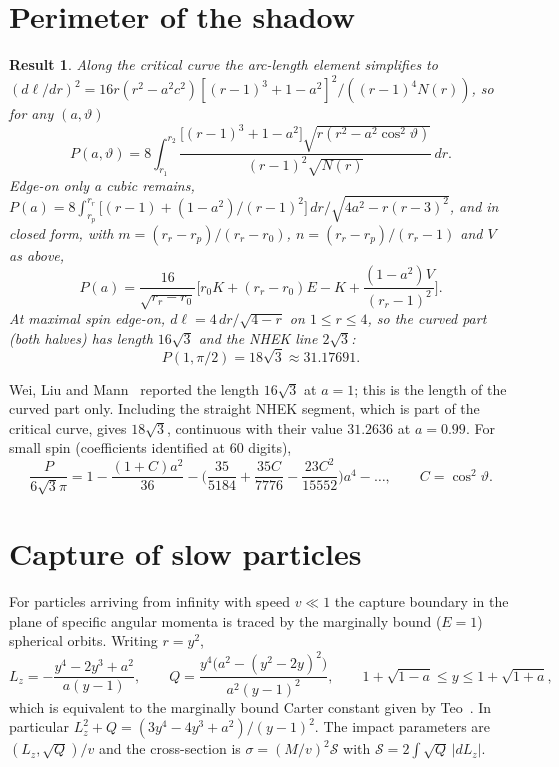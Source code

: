 \documentclass[11pt,a4paper]{article}
\newtheorem{result}{Result}
\theoremstyle{remark}
\numberwithin{equation}{section}
\begin{document}
\section{Perimeter of the shadow}\label{sec:perim}
\begin{result}\label{res:perim}
Along the critical curve the arc-length element simplifies to
$(d\ell/dr)^2=16r(r^2-a^2c^2)[(r-1)^3+1-a^2]^2/((r-1)^4N(r))$, so for any $(a,\vartheta)$
\begin{equation}
P(a,\vartheta)=8\int_{r_1}^{r_2}\frac{\big[(r-1)^3+1-a^2\big]\sqrt{r(r^2-a^2\cos^2\vartheta)}}{(r-1)^2\sqrt{N(r)}}\,dr .
\end{equation}
Edge-on only a cubic remains,
$P(a)=8\int_{r_p}^{r_r}\big[(r-1)+(1-a^2)/(r-1)^2\big]\,dr/\sqrt{4a^2-r(r-3)^2}$, and in closed form, with
$m=(r_r-r_p)/(r_r-r_0)$, $n=(r_r-r_p)/(r_r-1)$ and $V$ as above,
\begin{equation}
P(a)=\frac{16}{\sqrt{r_r-r_0}}\Big[r_0K+(r_r-r_0)E-K+\frac{(1-a^2)V}{(r_r-1)^2}\Big].
\end{equation}
At maximal spin edge-on, $d\ell=4\,dr/\sqrt{4-r}$ on $1\le r\le4$, so the curved part (both halves) has length $16\sqrt3$ and the
NHEK line $2\sqrt3$:
\begin{equation}
P(1,\pi/2)=18\sqrt3\approx31.17691 .
\end{equation}
\end{result}
Wei, Liu and Mann~\cite{WeiLiuMann2019} reported the length $16\sqrt3$ at $a=1$; this is the length of the curved
part only. Including the straight NHEK segment, which is part of the critical curve, gives $18\sqrt3$, continuous
with their value $31.2636$ at $a=0.99$. For small spin (coefficients identified at 60 digits),
\begin{equation}
\frac{P}{6\sqrt3\pi}=1-\frac{(1+C)a^2}{36}-\Big(\frac{35}{5184}+\frac{35C}{7776}-\frac{23C^2}{15552}\Big)a^4-\dots,\qquad C=\cos^2\vartheta .
\end{equation}

\section{Capture of slow particles}\label{sec:capture}
For particles arriving from infinity with speed $v\ll1$ the capture boundary in the plane of specific
angular momenta is traced by the marginally bound ($E=1$) spherical orbits. Writing $r=y^2$,
\begin{equation}
L_z=-\frac{y^4-2y^3+a^2}{a(y-1)},\qquad Q=\frac{y^4\big(a^2-(y^2-2y)^2\big)}{a^2(y-1)^2},\qquad 1+\sqrt{1-a}\le y\le1+\sqrt{1+a},
\label{eq:mb}
\end{equation}
which is equivalent to the marginally bound Carter constant given by Teo~\cite{Teo2021}. In particular
$L_z^2+Q=(3y^4-4y^3+a^2)/(y-1)^2$. The impact parameters are $(L_z,\sqrt Q)/v$ and the cross-section is
$\sigma=(M/v)^2\mathcal S$ with $\mathcal S=2\int\sqrt Q\,|dL_z|$.
\end{document}
